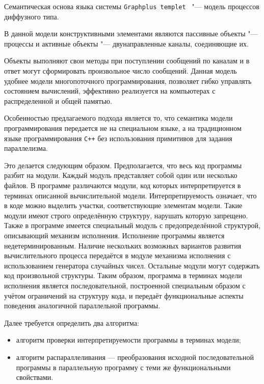 Семантическая основа языка системы {\tt Graphplus templet } "---  модель процессов диффузного типа. 

В данной модели конструктивными элементами являются пассивные объекты "--- процессы и активные объекты "--- двунаправленные каналы, соединяющие их. 

Объекты выполняют свои методы при поступлении сообщений по каналам и в ответ могут сформировать произвольное число сообщений. Данная модель удобнее модели многопоточного программирования, позволяет гибко управлять состоянием вычислений, эффективно реализуется на компьютерах с распределенной и общей памятью.



Особенностью предлагаемого подхода является то, что семантика модели программирования передается не на специальном языке, а на традиционном языке программирования {\tt C++} без использования примитивов для задания параллелизма.

Это делается следующим образом. Предполагается, что весь код программы разбит на модули. Каждый модуль представляет собой один или несколько файлов. В программе различаются модули, код которых интерпретируется в терминах описанной вычислительной модели. Интерпретируемость означает, что в коде можно выделить участки, соответствующие элементам модели. Такие модули имеют строго определённую структуру, нарушать которую запрещено. Также в программе имеется специальный модуль с предопределённой структурой, описывающий механизм исполнения. Исполнение программы является недетерминированным. Наличие нескольких возможных вариантов развития вычислительного процесса передаётся в модуле механизма исполнения с использованием генератора случайных чисел. Остальные модули могут содержать код произвольной структуры. Таким образом, программа в терминах модели исполнения является последовательной, построенной специальным образом с учётом ограничений на структуру кода, и передаёт функциональные аспекты поведения аналогичной параллельной программы.

Далее требуется определить два алгоритма: 

\begin{itemize}

\item алгоритм проверки интерпретируемости программы в терминах модели; 

\item алгоритм распараллеливания --- преобразования исходной пос\-ле\-до\-ва\-тель\-ной программы в параллельную программу с теми же функциональными свойствами. 

\end{itemize}

